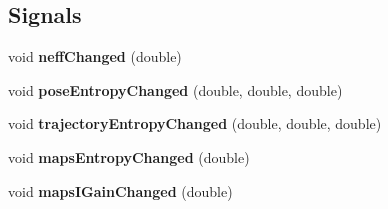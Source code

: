 \subsection*{Signals}
\begin{DoxyCompactItemize}
\item 
\mbox{\label{classGMapping_1_1QParticleViewer_aa70a9176ac24b207483f1b8470d4e7a5}} 
void {\bfseries neff\+Changed} (double)
\item 
\mbox{\label{classGMapping_1_1QParticleViewer_a664ea81c16768dd0cb016420d2e20f37}} 
void {\bfseries pose\+Entropy\+Changed} (double, double, double)
\item 
\mbox{\label{classGMapping_1_1QParticleViewer_a62567933d7ca1295ee975276552d466b}} 
void {\bfseries trajectory\+Entropy\+Changed} (double, double, double)
\item 
\mbox{\label{classGMapping_1_1QParticleViewer_a687bf4952a33cf999bb3fb9f07984aef}} 
void {\bfseries maps\+Entropy\+Changed} (double)
\item 
\mbox{\label{classGMapping_1_1QParticleViewer_a5fca217e9758ad7235345a313461cccb}} 
void {\bfseries maps\+I\+Gain\+Changed} (double)
\end{DoxyCompactItemize}
